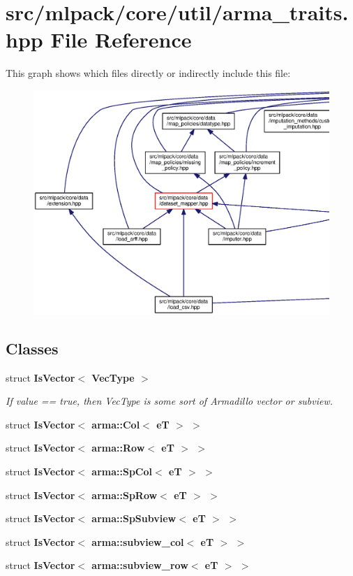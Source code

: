 \section{src/mlpack/core/util/arma\+\_\+traits.hpp File Reference}
\label{arma__traits_8hpp}
This graph shows which files directly or indirectly include this file\+:
\nopagebreak
\begin{figure}[H]
\begin{center}
\leavevmode
\includegraphics[width=350pt]{arma__traits_8hpp__dep__incl}
\end{center}
\end{figure}
\subsection*{Classes}
\begin{DoxyCompactItemize}
\item 
struct {\bf Is\+Vector$<$ Vec\+Type $>$}
\begin{DoxyCompactList}\small\item\em If value == true, then Vec\+Type is some sort of Armadillo vector or subview. \end{DoxyCompactList}\item 
struct {\bf Is\+Vector$<$ arma\+::\+Col$<$ e\+T $>$ $>$}
\item 
struct {\bf Is\+Vector$<$ arma\+::\+Row$<$ e\+T $>$ $>$}
\item 
struct {\bf Is\+Vector$<$ arma\+::\+Sp\+Col$<$ e\+T $>$ $>$}
\item 
struct {\bf Is\+Vector$<$ arma\+::\+Sp\+Row$<$ e\+T $>$ $>$}
\item 
struct {\bf Is\+Vector$<$ arma\+::\+Sp\+Subview$<$ e\+T $>$ $>$}
\item 
struct {\bf Is\+Vector$<$ arma\+::subview\+\_\+col$<$ e\+T $>$ $>$}
\item 
struct {\bf Is\+Vector$<$ arma\+::subview\+\_\+row$<$ e\+T $>$ $>$}
\end{DoxyCompactItemize}


